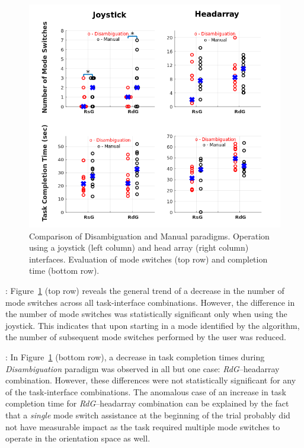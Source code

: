 \documentclass[conference]{IEEEtran}
\begin{document}
	\begin{figure}[t]
	\centering
	\includegraphics[width = 1.07\hsize,center]{./figures/DATA_PLOT.png}
	\vspace{-0.7cm}
	\caption{Comparison of Disambiguation and Manual paradigms. Operation using a joystick (left column) and head array (right column) interfaces. Evaluation of mode switches (top row) and completion time (bottom row).}
	\label{DATAPLOT}
\end{figure}
\vspace{0.1cm}
: Figure~\ref{DATAPLOT} (top row) reveals the general trend of a decrease in the number of mode switches across all task-interface combinations. However, the difference in the number of mode switches was statistically significant only when using the joystick. This indicates that upon starting in a mode identified by the algorithm, the number of subsequent mode switches performed by the user was reduced. 

\vspace{0.1cm}
: In Figure~\ref{DATAPLOT} (bottom row), a decrease in task completion times during \textit{Disambiguation} paradigm was observed in all but one case: \textit{RdG}--headarray combination. However, these differences were not statistically significant for any of the task-interface combinations. The anomalous case of an increase in task completion time for \textit{RdG}--headarray combination can be explained by the fact that a \textit{single} mode switch assistance at the beginning of the trial probably did not have measurable impact as the task required multiple mode switches to operate in the orientation space as well.
\end{document}
